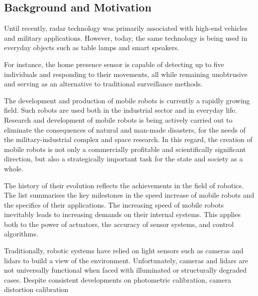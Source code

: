 \subsection{Background and Motivation}


Until recently, radar technology was primarily associated with high-end vehicles and military applications. However, today, the same technology is being used in everyday objects such as table lamps and smart speakers.

For instance, the \cite{Aqara_Presence_Sensor_FP2} home presence sensor is capable of detecting up to five individuals and responding to their movements, all while remaining unobtrusive and serving as an alternative to traditional surveillance methods.



The development and production of mobile robots is currently a rapidly growing field. Such robots are used both in the industrial sector and in everyday life. Research and development of mobile robots is being actively carried out to eliminate the consequences of natural and man-made disasters, for the needs of the military-industrial complex and space research. In this regard, the creation of mobile robots is not only a commercially profitable and scientifically significant direction, but also a strategically important task for the state and society as a whole.  

The history of their evolution reflects the achievements in the field of robotics. The list summarises the key milestones in the speed increase of mobile robots and the specifics of their applications. The increasing speed of mobile robots inevitably leads to increasing demands on their internal systems. This applies both to the power of actuators, the accuracy of sensor systems, and control algorithms\citep{turn0search0}.


Traditionally, robotic systems have relied on light sensors such as cameras and lidars to build a view of the environment. Unfortunately, cameras and lidars are not universally functional when faced with illuminated or structurally degraded cases. Despite consistent developments on photometric calibration\citep{PointLightYang}, camera distortion calibration \citep{Jin2019} 

